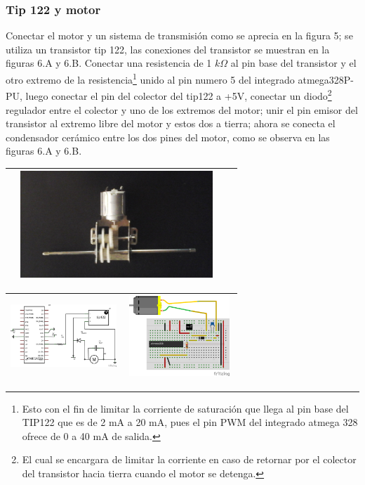 \documentclass[12]{article}
\newenvironment{Figure}
{\par\medskip\noindent\minipage{\linewidth}}
{\endminipage\par\medskip}
\begin{document}
\begin{multicols}{2}
\subsubsection{Tip 122 y motor}
Conectar el motor y un sistema de transmisión como se aprecia en la figura 5; se utiliza un transistor tip\cite{TIP122} 122, las conexiones del transistor se muestran en la  figuras 6.A y 6.B.
Conectar una resistencia de 1 $k \Omega $ al pin base del transistor y el otro extremo de la resistencia\footnote{Esto con el fin de limitar la corriente de saturación que llega al pin  base del TIP122 que es de 2 mA a 20 mA, pues el pin PWM del integrado atmega 328 ofrece de 0 a 40 mA de salida.}  unido al pin numero 5 del integrado atmega328P-PU, luego conectar el pin del colector del tip122 a +5V, conectar un  diodo\footnote{El cual se encargara de limitar la corriente en caso de retornar por el colector del transistor hacia tierra cuando el motor se detenga.} regulador entre el colector y uno de los extremos del motor; unir el pin emisor del transistor  al extremo libre del motor y estos dos a tierra; ahora se conecta el condensador cerámico entre los dos pines del motor, como se observa en las  figuras 6.A y 6.B.
\begin{Figure}
\center
\begin{tabular}{|l|r|}
\hline
\includegraphics[width=8cm, height=4cm]{img/transmision.png}  \\ \hline
\end{tabular}
\label{fig:g5}
\end{Figure}
\begin{Figure}
\center
\begin{tabular}{|l|r|}
\hline
\includegraphics[width=4cm, height=3cm]{img/esquemamotor.png} & \includegraphics[width=4cm, height=3cm]{img/montajemot.png} \\ \hline

\end{tabular}
\end{Figure}
\end{multicols}
\end{document}
